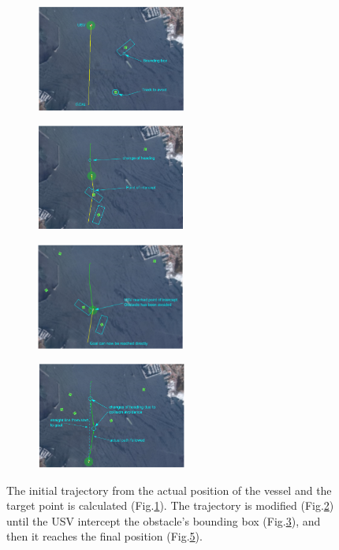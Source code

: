 \documentclass[12pt]{article}
\begin{document}
              \begin{figure}
                    \centering

                    \begin{subfigure}[b]{.40\linewidth}
                    \includegraphics[width=\linewidth, height= 3.5cm]{./Images/Casalino/bb1}
                    \caption{}\label{fig:bb1}
                    \end{subfigure}
                    \begin{subfigure}[b]{.40\linewidth}
                    \includegraphics[width=\linewidth, height= 3.5cm]{./Images/Casalino/bb2}
                    \caption{}\label{fig:bb2}
                    \end{subfigure}

                    \begin{subfigure}[b]{.40\linewidth}
                    \includegraphics[width=\linewidth, height= 3.5cm]{./Images/Casalino/bb3}
                    \caption{}\label{fig:bb3}
                    \end{subfigure}
                    \begin{subfigure}[b]{.40\linewidth}
                    \includegraphics[width=\linewidth, height= 3.5cm]{./Images/Casalino/bb4}
                    \caption{}\label{fig:bb4}
                    \end{subfigure}
                    \caption{The initial trajectory from the actual position of the vessel and the target point is calculated (Fig.\ref{fig:bb1}). The trajectory is modified (Fig.\ref{fig:bb2}) until the USV intercept the obstacle's bounding box (Fig.\ref{fig:bb3}), and then it reaches the final position (Fig.\ref{fig:bb4}).}
              \end{figure}\label{fig:bb}
\end{document}
